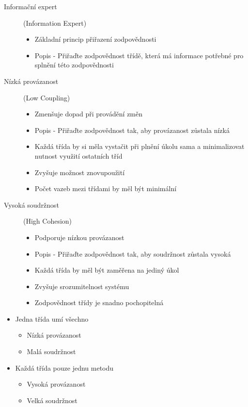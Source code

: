 \documentclass{szzclass}
\begin{document}
\begin{description}
\item[Informační expert] (Information Expert)
\begin{itemize}
\item Základní princip přiřazení zodpovědnosti
\item Popis - Přiřaďte zodpovědnost třídě, která má informace potřebné pro splnění této zodpovědnosti
\end{itemize}
\item[Nízká provázanost] (Low Coupling)
  \begin{itemize}
  \item Zmenšuje dopad při provádění změn
  \item Popis - Přiřaďte zodpovědnost tak, aby provázanost zůstala nízká
  \item Každá třída by si měla vystačit při plnění úkolu sama a minimalizovat nutnost využití ostatních tříd
  \item Zvyšuje možnost znovupoužití
  \item Počet vazeb mezi třídami by měl být minimální
  \end{itemize}
\item[Vysoká soudržnost] (High Cohesion)
  \begin{itemize}
  \item Podporuje nízkou provázanost
  \item Popis - Přiřaďte zodpovědnost tak, aby soudržnost zůstala vysoká
  \item Každá třída by měl být zaměřena na jediný úkol
  \item Zvyšuje srozumitelnost systému
  \item Zodpovědnost třídy je snadno pochopitelná
  \end{itemize}
\end{description}

\begin{itemize}
\item Jedna třída umí všechno
  \begin{itemize}
  \item Nízká provázanost
  \item Malá soudržnost
  \end{itemize}
\item Každá třída pouze jednu metodu
  \begin{itemize}
  \item Vysoká provázanost
  \item Velká soudržnost
  \end{itemize}
\end{itemize}
\end{document}
